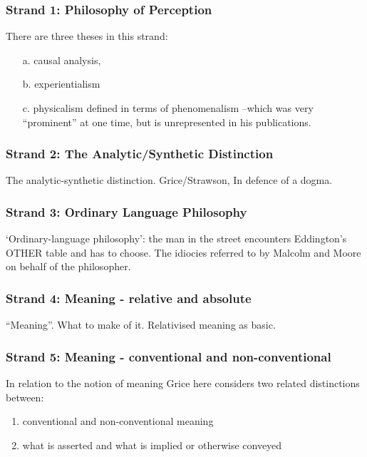 \documentclass[10pt,titlepage]{book}
\begin{document}
\subsubsection{Strand 1: Philosophy of Perception}

There are three theses in this strand:
\begin{itemize}
\item[a.] causal analysis,
\item[b.] experientialism
\item[c.] physicalism defined in terms of phenomenalism
--which was very ``prominent'' at one time, but is unrepresented in his
publications.
\end{itemize}

\subsubsection{Strand 2: The Analytic/Synthetic Distinction}

The analytic-synthetic distinction.
Grice/Strawson, In defence of a
dogma.

\subsubsection{Strand 3: Ordinary Language Philosophy}

`Ordinary-language philosophy': the man in the street encounters
Eddington's OTHER table and has to choose. The idiocies referred to by
Malcolm and Moore on behalf of the philosopher.

\subsubsection{Strand 4: Meaning - relative and absolute}

``Meaning''.
What to make of it.
Relativised meaning as basic.

\subsubsection{Strand 5: Meaning - conventional and non-conventional}

In relation to the notion of meaning Grice here considers two related distinctions between:

\begin{enumerate}
\item conventional and non-conventional meaning
\item what is asserted and what is implied or otherwise conveyed
\end{enumerate}
\end{document}
